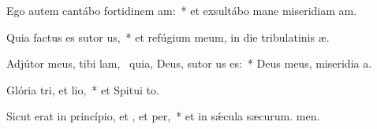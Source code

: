 \item Ego autem cantábo fortidinem am:~* et exsultábo mane miseridiam am.
\item Quia factus es sutor us,~* et refúgium meum, in die tribulatinis æ.
\item Adjútor meus, tibi lam,~\pscross{} quia, Deus, sutor us es:~* Deus meus, miseridia a.
\item Glória tri, et lio,~* et Spitui to.
\item Sicut erat in princípio, et , et per,~* et in sǽcula sæcurum. men.
